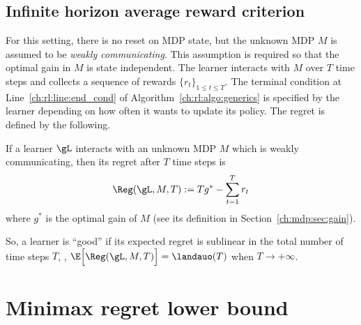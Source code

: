 \subsection{Infinite horizon average reward criterion}
For this setting, there is no reset on MDP state, but the unknown MDP $M$ is assumed to be \emph{weakly communicating}.
This assumption is required so that the optimal gain in $M$ is state independent.
The learner interacts with $M$ over $T$ time steps and collects a sequence of rewards $\{r_t\}_{1\le t\le T}$.
The terminal condition at Line~\ref{ch:rl:line:end_cond} of Algorithm~\ref{ch:rl:algo:generics} is specified by the learner depending on how often it wants to update its policy.
The regret is defined by the following.
\begin{defn}
    If a learner $\gL$ interacts with an unknown MDP $M$ which is weakly communicating, then its regret after $T$ time steps is
    \begin{equation}
        \label{eq:rg_infinite}
        \Reg(\gL, M, T):= Tg^* -\sum_{t=1}^Tr_t
    \end{equation}
    where $g^*$ is the optimal gain of $M$ (see its definition in Section~\ref{ch:mdp:sec:gain}).
    \label{ch:rl:defn:rg_infinite}
\end{defn}
So, a learner is ``good'' if its expected regret is sublinear in the total number of time steps $T$, \ie, $\E\Big[\Reg(\gL, M, T)\Big]= \landauo(T)$ when $T\to+\infty$.




\section{Minimax regret lower bound}
\label{ch:rl:sec:baseline}

